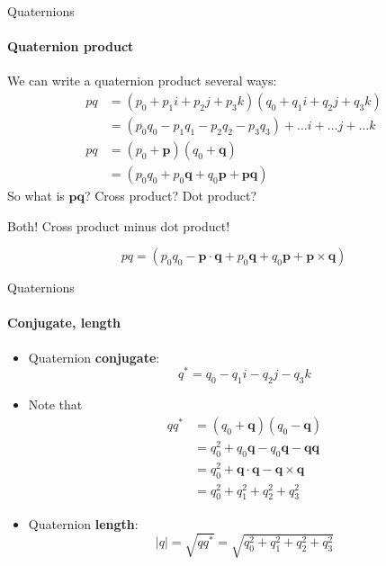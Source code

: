 \documentclass[aspectratio=169]{beamer}
\begin{document}
\begin{frame}{Quaternions}
    \framesubtitle{Quaternion product}

    We can write a quaternion product several ways:
    \begin{align*}
        pq & = (p_0 + p_1 i + p_2 j + p_3 k)  (q_0 + q_1 i + q_2 j + q_3 k)             \\
           & = (p_0 q_0 - p_1 q_1 - p_2 q_2 - p_3 q_3) + \ldots i + \ldots j + \ldots k \\
        pq & = (p_0 + \mathbf{p}) (q_0 + \mathbf{q})                                    \\
           & = (p_0 q_0 + p_0 \mathbf{q} + q_0 \mathbf{p} + \mathbf{p} \mathbf{q})
    \end{align*}
    So what is $\mathbf{p} \mathbf{q}$?  Cross product?  Dot product?

    Both!  Cross product minus dot product!

    \begin{equation}
        pq = (p_0 q_0 - \mathbf{p} \cdot \mathbf{q} + p_0 \mathbf{q} + q_0 \mathbf{p} + \mathbf{p} \times \mathbf{q})
    \end{equation}

\end{frame}


\begin{frame}{Quaternions}
    \framesubtitle{Conjugate, length}

    \begin{itemize}
        \item Quaternion \textbf{conjugate}:
              \begin{equation}
                  q^* = q_0 - q_1 i - q_2 j - q_3 k
              \end{equation}
        \item Note that
              \begin{align*}
                  q q^* & = (q_0 + \mathbf{q})(q_0 - \mathbf{q})                               \\
                        & = q_0^2 + q_0 \mathbf{q} - q_0 \mathbf{q} - \mathbf{q} \mathbf{q}    \\
                        & = q_0^2 + \mathbf{q} \cdot \mathbf{q} - \mathbf{q} \times \mathbf{q} \\
                        & = q_0^2 + q_1^2 + q_2^2 + q_3^2
              \end{align*}
        \item Quaternion \textbf{length}:
              \begin{equation}
                  |q| = \sqrt{q q^*} = \sqrt{q_0^2 + q_1^2 + q_2^2 + q_3^2}
              \end{equation}
    \end{itemize}
\end{frame}
\end{document}

